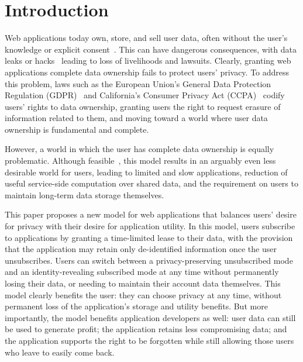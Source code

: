 \section{Introduction}

Web applications today own, store, and sell user data, often without the user's knowledge or
explicit consent~\cite{nytimes:fb, npr:data}. This can have dangerous consequences, with data leaks or
hacks~\cite{breach:twitter, breach:fb, breach:marriott, breach:quora} leading to loss of
livelihoods and lawsuits. Clearly, granting web applications complete data ownership fails to
protect users' privacy. To address this problem, laws such as the European Union's General Data
Protection Regulation (GDPR)~\cite{eu:gdpr} and California's Consumer Privacy Act
(CCPA)~\cite{ca:privacy-act} codify users' rights to data ownership, granting users the right to
request erasure of information related to them, and moving toward a world where user data 
ownership is fundamental and complete.

However, a world in which the user has complete data ownership is equally problematic.
Although feasible~\cite{amber, w5, blockstack, bstore, blockstack}, this model results in an
arguably even less desirable world for users, leading to limited and slow applications, reduction of
useful service-side computation over shared data, and the requirement on users to maintain long-term
data storage themselves.  

This paper proposes a new model for web applications that balances users' desire for privacy with
their desire for application utility. In this model, users subscribe to applications by granting a
time-limited lease to their data, with the provision that the application may retain only
de-identified information once the user unsubscribes. Users can switch between a privacy-preserving
unsubscribed mode and an identity-revealing subscribed mode at any time without permanently losing
their data, or needing to maintain their account data themselves.  This model clearly benefits the
user: they can choose privacy at any time, without permanent loss of the application's storage and
utility benefits. But more importantly, the model benefits application developers as well: user data
can still be used to generate profit; the application retains less compromising data; and the
application supports the right to be forgotten while still allowing those users who leave to
easily come back.

